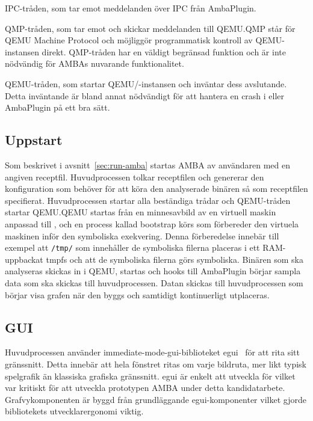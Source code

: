IPC-tråden, som tar emot meddelanden över IPC från AmbaPlugin.

QMP-tråden, som tar emot och skickar meddelanden till QEMU.\@ QMP står för QEMU
Machine Protocol och möjliggör programmatisk kontroll av QEMU-instansen direkt.
QMP-tråden har en väldigt begränsad funktion och är inte nödvändig för AMBAs
nuvarande funktionalitet.

QEMU-tråden, som startar QEMU/\stoe{}-instansen och inväntar dess avslutande.
Detta inväntande är bland annat nödvändigt för att hantera en crash i \stoe{}
eller AmbaPlugin på ett bra sätt.

\subsection{Uppstart}

Som beskrivet i avsnitt~\ref{sec:run-amba} startas AMBA av användaren med en
angiven receptfil. Huvudprocessen tolkar receptfilen och genererar den
konfiguration som \stoe{} behöver för att köra den analyserade binären så som
receptfilen specifierat. Huvudprocessen startar alla beständiga trådar och
QEMU-tråden startar QEMU.\@ QEMU startas från en minnesavbild av en virtuell
maskin anpassad till \stoe{}, och en process kallad bootstrap körs som
förbereder den virtuela maskinen inför den symboliska exekvering. Denna
förberedelse innebär till exempel att \verb|/tmp/| som innehåller de symboliska
filerna placeras i ett RAM-uppbackat tmpfs och att de symboliska filerna görs
symboliska. Binären som ska analyseras skickas in i QEMU, startas och hooks till
AmbaPlugin börjar sampla data som ska skickas till huvudprocessen. Datan skickas
till huvudprocessen som börjar visa grafen när den byggs och samtidigt
kontinuerligt utplaceras.

\subsection{GUI}

Huvudprocessen använder immediate-mode-gui-biblioteket egui~\cite{egui} för att
rita sitt gränssnitt. Detta innebär att hela fönstret ritas om varje bildruta,
mer likt typisk spelgrafik än klassiska grafiska gränssnitt. egui är enkelt att
utveckla för vilket var kritiskt för att utveckla prototypen AMBA under detta
kandidatarbete. Grafvykomponenten är byggd från grundläggande egui-komponenter
vilket gjorde bibliotekets utvecklarergonomi viktig.

\section{\stoe{}}


